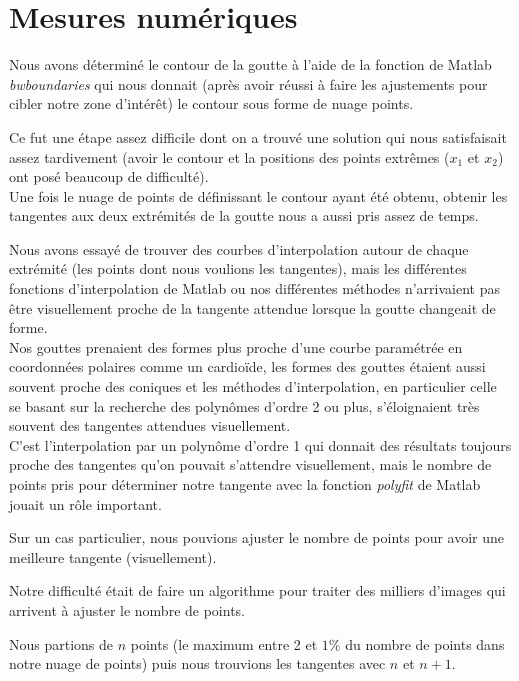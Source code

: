 \documentclass[french]{article}
\begin{document}
\newpage
\section{Mesures numériques}

Nous avons déterminé le contour de la goutte à l'aide de la fonction de Matlab \emph{bwboundaries} qui nous donnait (après avoir réussi à faire les ajustements pour cibler notre zone d'intérêt) le contour sous forme de nuage points.

Ce fut une étape assez difficile dont on a trouvé une solution qui nous satisfaisait assez tardivement (avoir le contour et la positions des points extrêmes ($x_{1}$ et $x_{2}$) ont posé beaucoup de difficulté).  \\

Une fois le nuage de points de définissant le contour ayant été obtenu, obtenir les tangentes aux deux extrémités de la goutte nous a aussi pris assez de temps.

Nous avons essayé de trouver des courbes d'interpolation autour de chaque extrémité (les points dont nous voulions les tangentes), mais les différentes fonctions d'interpolation de Matlab ou nos différentes méthodes n'arrivaient pas être visuellement proche de la tangente attendue lorsque la goutte changeait de forme.\\

Nos gouttes prenaient des formes plus proche d'une courbe paramétrée en coordonnées polaires comme un cardioïde, les formes des gouttes étaient aussi souvent proche des coniques et les méthodes d'interpolation, en particulier celle se basant sur la recherche des polynômes d'ordre 2 ou plus, s'éloignaient très souvent des tangentes attendues visuellement.\\

C'est l'interpolation par un polynôme d'ordre 1 qui donnait des résultats toujours proche des tangentes qu'on pouvait s'attendre visuellement, mais le nombre de points pris pour déterminer notre tangente avec la fonction \emph{polyfit} de Matlab jouait un rôle important.

Sur un cas particulier, nous pouvions ajuster le nombre de points pour avoir une meilleure tangente (visuellement).

Notre difficulté était de faire un algorithme pour traiter des milliers d'images qui arrivent à ajuster le nombre de points.

Nous partions de $n$ points (le maximum entre 2 et $1\%$ du nombre de points dans notre nuage de points) puis nous trouvions les tangentes avec $n$ et $n+1$.
\end{document}
